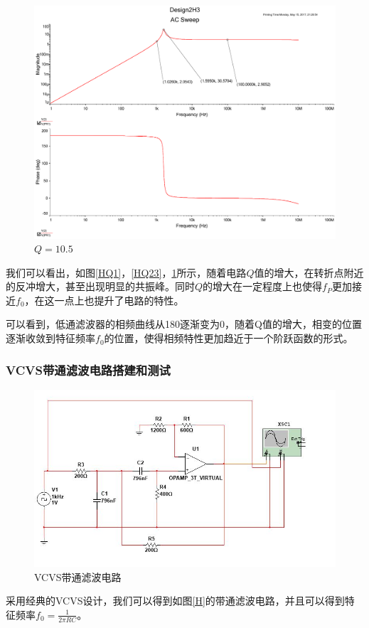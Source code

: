 \documentclass[UTF8,a4paper]{paper}
\begin{document}
\begin{multicols}{3}
\begin{figure}[H]
\includegraphics[width=\columnwidth]{2H10_5.pdf}
\caption{$Q=10.5$}
\label{HQ10}
\end{figure}
\end{multicols}

我们可以看出，如图\ref{HQ1}，\ref{HQ23}，\ref{HQ10}所示，随着电路$Q$值的增大，在转折点附近的反冲增大，甚至出现明显的共振峰。同时$Q$的增大在一定程度上也使得$f_P$更加接近$f_0$，在这一点上也提升了电路的特性。

可以看到，低通滤波器的相频曲线从180逐渐变为0，随着Q值的增大，相变的位置逐渐收敛到特征频率$f_0$的位置，使得相频特性更加趋近于一个阶跃函数的形式。
\subsubsection{VCVS带通滤波电路搭建和测试}
\begin{figure}[h]
\centering
\includegraphics[width=\columnwidth]{P.jpg}
\caption{VCVS带通滤波电路}
\label{P}
\end{figure}
采用经典的VCVS设计，我们可以得到如图\ref{H}的带通滤波电路，并且可以得到特征频率$f_0=\frac{1}{2\pi RC}$。
\end{document}
